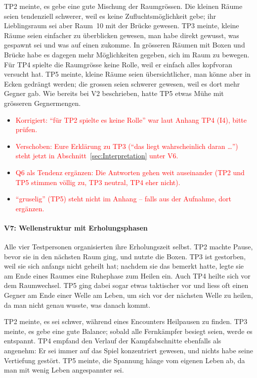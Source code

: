 \documentclass[../Main.tex]{subfiles}
\begin{document}
TP2 meinte, es gebe eine gute Mischung der Raumgrössen. Die kleinen Räume seien tendenziell schwerer, weil es keine Zufluchtsmöglichkeit gebe; ihr Lieblingsraum sei aber Raum~10 mit der Brücke gewesen. TP3 meinte, kleine Räume seien einfacher zu überblicken gewesen, man habe direkt gewusst, was gespawnt sei und was auf einen zukomme. In grösseren Räumen mit Boxen und Brücke habe es dagegen mehr Möglichkeiten gegeben, sich im Raum zu bewegen. Für TP4 spielte die Raumgrösse keine Rolle, weil er einfach alles kopfvoran versucht hat. TP5 meinte, kleine Räume seien übersichtlicher, man könne aber in Ecken gedrängt werden; die grossen seien schwerer gewesen, weil es dort mehr Gegner gab. Wie bereits bei V2 beschrieben, hatte TP5 etwas Mühe mit grösseren Gegnermengen.

\begin{itemize}[leftmargin=1.5cm]
    \item \textcolor{red}{Korrigiert: \enquote{für TP2 spielte es keine Rolle} war laut Anhang TP4 (I4), bitte prüfen.}
    \item \textcolor{red}{Verschoben: Eure Erklärung zu TP3 (\enquote{das liegt wahrscheinlich daran \ldots}) steht jetzt in Abschnitt~\ref{sec:Interpretation} unter V6.}
    \item \textcolor{red}{Q6 als Tendenz ergänzen: Die Antworten gehen weit auseinander (TP2 und TP5 stimmen völlig zu, TP3 neutral, TP4 eher nicht).}
    \item \textcolor{red}{\enquote{gruselig} (TP5) steht nicht im Anhang -- falls aus der Aufnahme, dort ergänzen.}
\end{itemize}

\paragraph{V7: Wellenstruktur mit Erholungsphasen}
Alle vier Testpersonen organisierten ihre Erholungszeit selbst. TP2 machte Pause, bevor sie in den nächsten Raum ging, und nutzte die Boxen. TP3 ist gestorben, weil sie sich anfangs nicht geheilt hat; nachdem sie das bemerkt hatte, legte sie am Ende eines Raumes eine Ruhephase zum Heilen ein. Auch TP4 heilte sich vor dem Raumwechsel. TP5 ging dabei sogar etwas taktischer vor und liess oft einen Gegner am Ende einer Welle am Leben, um sich vor der nächsten Welle zu heilen, da man nicht genau wusste, was danach kommt.

TP2 meinte, es sei schwer, während eines Encounters Heilpausen zu finden. TP3 meinte, es gebe eine gute Balance; sobald alle Fernkämpfer besiegt seien, werde es entspannt. TP4 empfand den Verlauf der Kampfabschnitte ebenfalls als angenehm: Er sei immer auf das Spiel konzentriert gewesen, und nichts habe seine Vertiefung gestört. TP5 meinte, die Spannung hänge vom eigenen Leben ab, da man mit wenig Leben angespannter sei.
\end{document}
